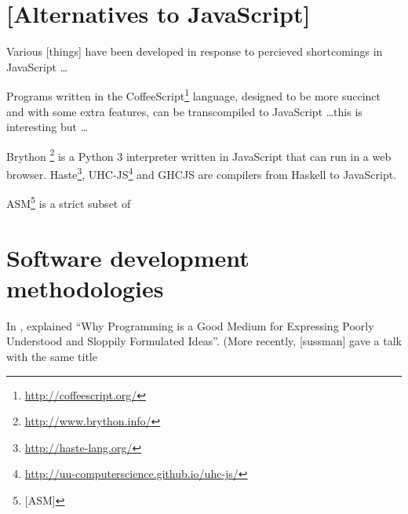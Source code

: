 \documentclass[authoryearcitations]{UoYCSproject}
\begin{document}
\section{[Alternatives to JavaScript]}

Various [things] have been developed in response to percieved shortcomings in JavaScript \ldots

Programs written in the CoffeeScript\footnote{\url{http://coffeescript.org/}} language, designed to be more succinct and with some extra features, can be transcompiled to JavaScript \ldots this is interesting but \ldots

Brython \footnote{\url{http://www.brython.info/}} is a Python 3 interpreter written in JavaScript that can run in a web browser. Haste\footnote{\url{http://haste-lang.org/}}, UHC-JS\footnote{\url{http://uu-computerscience.github.io/uhc-js/}} and GHCJS are compilers from Haskell to JavaScript. 


ASM\footnote{[ASM]} is a strict subset of 

\section{Software development methodologies}

In \citeyear{67poorslop}, \citet{67poorslop} explained ``Why Programming is a Good Medium for Expressing Poorly Understood and Sloppily Formulated Ideas''.
(More recently, [sussman] gave a talk with the same title 



\end{document}
